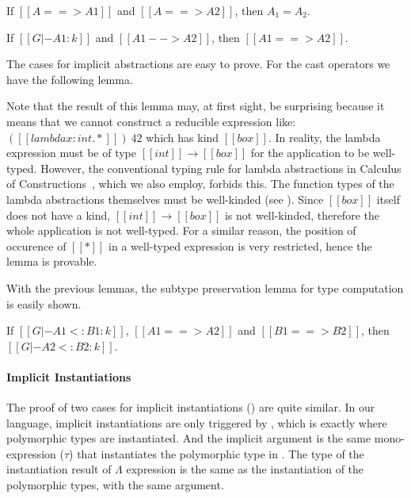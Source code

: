 \begin{lemma}
    If $[[A ==> A1]]$ and $[[A ==> A2]]$,
    then $A_1 = A_2$.
\end{lemma}

\begin{lemma}
    If $[[G |- A1 : k]]$ and $[[A1 --> A2]]$,
    then $[[A1 ==> A2]]$.
\end{lemma}

The cases for implicit abstractions are easy to prove. For the cast operators
we have the following lemma.


Note that the result of this lemma may, at first sight, be surprising
because it means that we cannot construct
a reducible expression like: $([[lambda x : int. *]])~42$ which has kind $[[box]]$.
In reality, the lambda expression must be of type $[[int]] \rightarrow [[box]]$
for the application to be well-typed. However, the conventional typing rule for
lambda abstractions in Calculus of Constructions~\cite{coc}, which we also employ,
forbids this. The function types of the lambda abstractions themselves
must be well-kinded (see ). Since $[[box]]$ itself does not have a kind,
$[[int]] \rightarrow [[box]]$ is not well-kinded, therefore the whole application
is not well-typed. For a similar reason, the position of occurence of $[[*]]$
in a well-typed expression is very restricted, hence the lemma is provable.

With the previous lemmas, the subtype preservation lemma for type computation is easily shown.

\begin{lemma}
    If $[[G |- A1 <: B1 : k]]$, $[[A1 ==> A2]]$ and $[[B1 ==> B2]]$,
    then $[[G |- A2 <: B2 : k]]$.
\end{lemma}

\paragraph{Implicit Instantiations}
The proof of two cases for implicit instantiations ()
are quite similar. In our language, implicit instantiations are only triggered by
, which is exactly where polymorphic types are instantiated.
And the implicit argument is the same mono-expression ($\tau$) that
instantiates the polymorphic type in .
The type of the instantiation result of $\Lambda$ expression is the same as the
instantiation of the polymorphic types, with the same argument.


